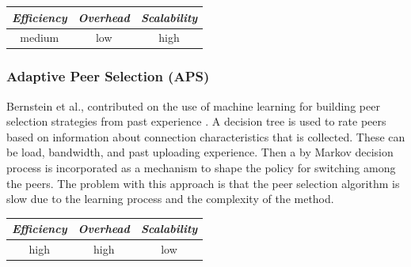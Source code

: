 %
%

\begin{center}
\begin{tabular}{ccc}
\emph{Efficiency} & \emph{Overhead} & \emph{Scalability} \\
\hline
medium &
low &
high
\end{tabular}
\end{center}

\subsubsection{Adaptive Peer Selection (APS)}
Bernstein et al., contributed on the use of machine learning for building peer
selection strategies from past experience \cite{BFLZ2003}. A decision tree is
used to rate peers based on information about connection characteristics that is
collected. These can be load, bandwidth, and past uploading experience. Then a
by Markov decision process is incorporated as a mechanism to shape the policy
for switching among the peers. The problem with this approach is that the peer
selection algorithm is slow due to the learning process and the complexity of
the method.

\begin{center}
\begin{tabular}{ccc}
\emph{Efficiency} & \emph{Overhead} & \emph{Scalability} \\
\hline
high &
high &
%
low
\end{tabular}
\end{center}

